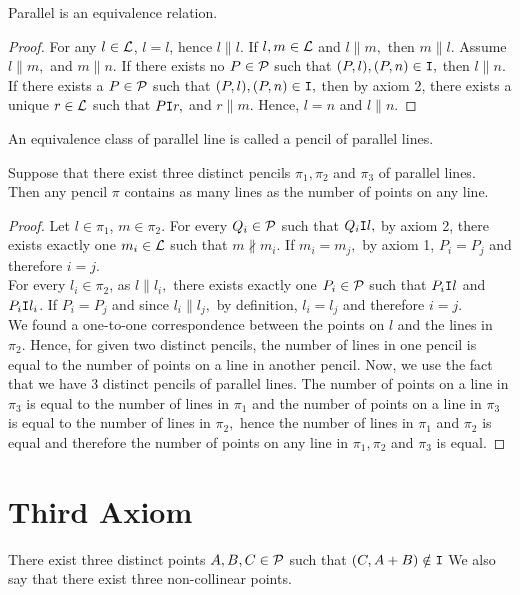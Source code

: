 \begin{theorem}
    Parallel is an equivalence relation.
\end{theorem}
\begin{proof}
    For any $l \in \mathcal{L}$, $l=l$, hence $l \parallel l.$ If $l,m \in \mathcal{L}$ and $l \parallel m,$ then $m \parallel l.$ Assume $l \parallel m,$ and $m \parallel n$. If there exists no $P \in \mathcal{P}$ such that $(P,l),(P,n) \in \texttt{I},$ then $l \parallel n.$ If there exists a $P \in \mathcal{P}$ such that $(P,l),(P,n) \in \texttt{I},$ then by axiom 2, there exists a unique $r \in \mathcal{L}$ such that $P \texttt{I} r,$ and $ r \parallel m.$ Hence, $l=n$ and $l \parallel n.$
\end{proof}

An equivalence class of parallel line is called a pencil of parallel lines.

\begin{theorem}
    Suppose that there exist three distinct pencils $\pi_1, \pi_2$ and $\pi_3$ of parallel lines. Then any pencil $\pi$ contains as many lines as the number of points on any line.
\end{theorem}
\begin{proof}
    Let $l \in \pi_1$, $m \in \pi_2.$ For every $Q_i \in \mathcal{P}$ such that $Q_i \texttt{I} l,$ by axiom 2, there exists exactly one $m_i \in \mathcal{L}$ such that $m \nparallel m_i.$ If $m_i = m_j,$ by axiom 1, $P_i=P_j$ and therefore $i=j.$ \\
    For every $l_i \in \pi_2$, as $l \parallel l_i,$ there exists exactly one $P_i \in \mathcal{P}$ such that $P_i \texttt{I} l$ and $P_i \texttt{I} l_i$. If $P_i = P_j$ and since $l_i \parallel l_j,$ by definition, $l_i=l_j$ and therefore $i=j.$  \\
    We found a one-to-one correspondence between the points on $l$ and the lines in $\pi_2.$ Hence, for given two distinct pencils, the number of lines in one pencil is equal to the number of points on a line in another pencil. Now, we use the fact that we have 3 distinct pencils of parallel lines. The number of points on a line in $\pi_3$ is equal to the number of lines in $\pi_1$ and the number of points on a line in $\pi_3$ is equal to the number of lines in $\pi_2,$ hence the number of lines in $\pi_1$ and $\pi_2$ is equal and therefore the number of points on any line in $\pi_1, \pi_2$ and $\pi_3$ is equal.
\end{proof}

\section{Third Axiom}
\begin{axiom}[3]
    There exist three distinct points $A,B,C \in \mathcal{P}$ such that $(C,A+B) \notin \texttt{I}$ We also say that there exist three non-collinear points.
\end{axiom}

